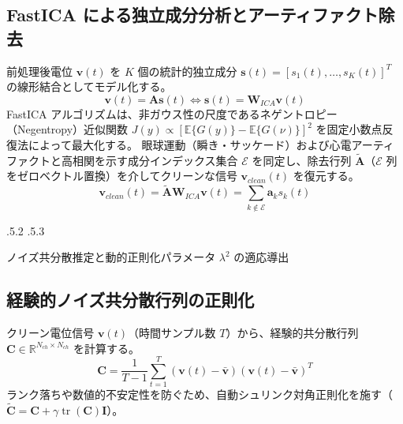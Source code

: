 \documentclass[platex,dvipdfmx,12pt]{jsarticle}
\makeatletter
\renewcommand{\section}{%
  \clearpage
  \@startsection{section}{1}{\z@}%
  {\Cvs \@plus.5\Cdp \@minus.2\Cdp}%
  {.5\Cvs \@plus.3\Cdp}%
  {\normalfont\LARGE\headfont\raggedright}%
}
\makeatother
\begin{document}
\subsection{FastICA による独立成分分析とアーティファクト除去}
前処理後電位 $\mathbf{v}(t)$ を $K$ 個の統計的独立成分 $\mathbf{s}(t) = [s_1(t), \dots, s_K(t)]^T$ の線形結合としてモデル化する。
\begin{equation}
  \mathbf{v}(t) = \mathbf{A} \mathbf{s}(t) \iff \mathbf{s}(t) = \mathbf{W}_{ICA} \mathbf{v}(t)
  \label{eq:ica_model}
\end{equation}
FastICA アルゴリズム\cite{hyvarinen1999fastica}は、非ガウス性の尺度であるネゲントロピー（Negentropy）近似関数 $J(y) \propto [\mathbb{E}\{G(y)\} - \mathbb{E}\{G(\nu)\}]^2$ を固定小数点反復法によって最大化する。
眼球運動（瞬き・サッケード）および心電アーティファクトと高相関を示す成分インデックス集合 $\mathcal{E}$ を同定し、除去行列 $\tilde{\mathbf{A}}$（$\mathcal{E}$ 列をゼロベクトル置換）を介してクリーンな信号 $\mathbf{v}_{clean}(t)$ を復元する。
\begin{equation}
  \mathbf{v}_{clean}(t) = \tilde{\mathbf{A}} \mathbf{W}_{ICA} \mathbf{v}(t) = \sum_{k \notin \mathcal{E}} \mathbf{a}_k s_k(t)
  \label{eq:ica_cleaning}
\end{equation}

\section{ノイズ共分散推定と動的正則化パラメータ $\lambda^2$ の適応導出}

\subsection{経験的ノイズ共分散行列の正則化}
クリーン電位信号 $\mathbf{v}(t)$（時間サンプル数 $T$）から、経験的共分散行列 $\mathbf{C} \in \mathbb{R}^{N_{ch} \times N_{ch}}$ を計算する。
\begin{equation}
  \mathbf{C} = \frac{1}{T-1} \sum_{t=1}^T (\mathbf{v}(t) - \bar{\mathbf{v}})(\mathbf{v}(t) - \bar{\mathbf{v}})^T
  \label{eq:covariance}
\end{equation}
ランク落ちや数値的不安定性を防ぐため、自動シュリンク対角正則化を施す（$\tilde{\mathbf{C}} = \mathbf{C} + \gamma \operatorname{tr}(\mathbf{C}) \mathbf{I}$）。
\end{document}

